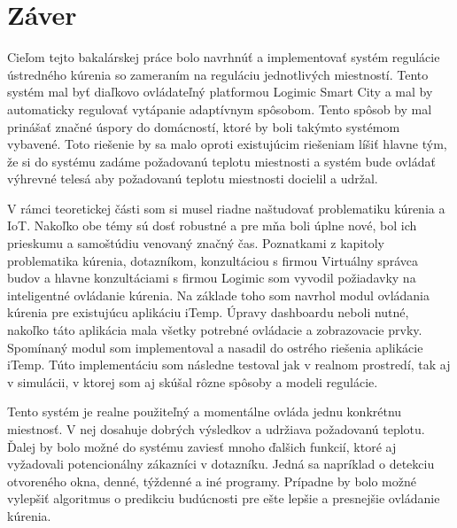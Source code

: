 \chapter{Záver}\label{zaver}
Cieľom tejto bakalárskej práce bolo navrhnúť a implementovať systém regulácie ústredného kúrenia so zameraním na reguláciu jednotlivých miestností. 
Tento systém mal byť diaľkovo ovládateľný platformou Logimic Smart City a mal by automaticky regulovať vytápanie adaptívnym spôsobom. 
Tento spôsob by mal prinášať značné úspory do domácností, ktoré by boli takýmto systémom vybavené. 
Toto riešenie by sa malo oproti existujúcim riešeniam líšiť hlavne tým, že si do systému zadáme požadovanú teplotu miestnosti a systém bude ovládať výhrevné telesá aby požadovanú teplotu miestnosti docielil a udržal.

V rámci teoretickej části som si musel riadne naštudovať problematiku kúrenia a IoT. Nakoľko obe témy sú dosť robustné a pre mňa boli úplne nové, bol ich prieskumu a samoštúdiu venovaný značný čas. Poznatkami z kapitoly problematika kúrenia, dotazníkom, konzultáciou s firmou Virtuálny správca budov a hlavne konzultáciami s firmou Logimic som vyvodil požiadavky na inteligentné ovládanie kúrenia. Na základe toho som navrhol modul ovládania kúrenia pre existujúcu aplikáciu iTemp. Úpravy dashboardu neboli nutné, nakoľko táto aplikácia mala všetky potrebné ovládacie a zobrazovacie prvky. Spomínaný modul som implementoval a nasadil do ostrého riešenia aplikácie iTemp.
Túto implementáciu som následne testoval jak v realnom prostredí, tak aj v simulácii, v ktorej som aj skúšal rôzne spôsoby a modeli regulácie.

Tento systém je realne použiteľný a momentálne ovláda jednu konkrétnu miestnosť. V nej dosahuje dobrých výsledkov a udržiava požadovanú teplotu. Ďalej by bolo možné do systému zaviesť mnoho ďalšich funkcií, ktoré aj vyžadovali potencionálny zákazníci v dotazníku. Jedná sa napríklad o detekciu otvoreného okna, denné, týždenné a iné programy. Prípadne by bolo možné vylepšiť algoritmus o predikciu budúcnosti pre ešte lepšie a presnejšie ovládanie kúrenia.
